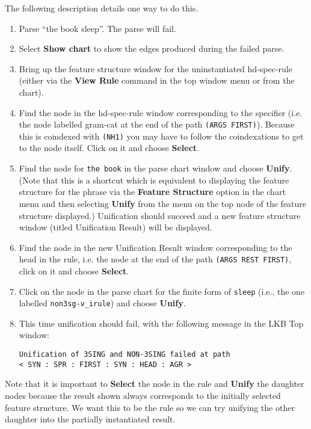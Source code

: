 \documentclass[12pt]{report}
\newcommand{\lkbentryname}[1]{{\tt #1}}
\newcommand{\lkbmenucommand}{\bf}
\begin{document}
The following description details one way to do this.
\begin{enumerate}
\item Parse ``the book sleep''.  The parse will fail.
\item Select {\lkbmenucommand Show chart} to show the edges produced
during the failed parse.
\item Bring up the feature structure window for 
the uninstantiated hd-spec-rule 
(either via the {\lkbmenucommand View Rule} command in the top window menu
or from the chart).
\item Find the node in the hd-spec-rule window corresponding
to the specifier (i.e. the node labelled {\type gram-cat} at
the end of the path {\tt (ARGS FIRST)}).  Because this is
coindexed with {\tt (NH1)} you may have to follow the coindexations
to get to the node itself.
Click on it and choose {\lkbmenucommand Select}.
\item Find the
node for {\tt the book} in the parse chart window
and choose {\lkbmenucommand Unify}.
(Note that this is a shortcut which is equivalent to displaying the 
feature structure for the
phrase via the {\lkbmenucommand Feature Structure} option in the 
chart menu and then selecting {\lkbmenucommand Unify} from the menu on 
the top node of the feature structure displayed.)
Unification should succeed and a new feature structure
window (titled Unification Result) will be displayed.  
\item Find the node in the new Unification Result window corresponding
to the head in the rule, i.e. the node at
the end of the path {\tt (ARGS REST FIRST)}, click on it and choose {\lkbmenucommand Select}.
\item Click on the
node in the parse chart for the finite form of
{\tt sleep} (i.e., the one labelled
\lkbentryname{non3sg-v\_irule}) and choose {\lkbmenucommand Unify}.
\item This time unification should fail, with the following message
in the LKB Top window:
\begin{verbatim}
Unification of 3SING and NON-3SING failed at path 
< SYN : SPR : FIRST : SYN : HEAD : AGR >
\end{verbatim}
\end{enumerate}

Note that it is important to 
{\lkbmenucommand Select} the node in the rule and {\lkbmenucommand Unify} the daughter nodes
because the result shown always corresponds to the 
initially selected feature structure.  
We want this to be the rule so we can try
unifying the other daughter into the partially instantiated result.
\end{document}
